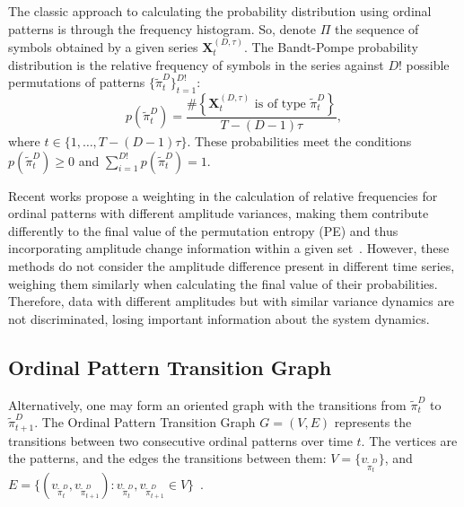 \documentclass[journal]{IEEEtran}
\begin{document}
	The classic approach to calculating the probability distribution using ordinal patterns is through the frequency histogram.
	So, denote $\Pi$ the sequence of symbols obtained by a given series $\mathbf{X}_t^{(D,\tau)}$.
	The Bandt-Pompe probability distribution is the relative frequency of symbols in the series against $D!$ possible permutations of patterns $\{\widetilde\pi_t^D \}_{t = 1}^{D!}$:
	\begin{equation}
		p(\widetilde\pi_t^D) = \frac{\#\left \{\mathbf{X}_t^{(D,\tau)} \text{ is of type } \widetilde\pi_t^D\right \}}{T- (D-1)\tau},  
	\end{equation}
	where  $t\in \{1, \dots, T-(D-1)\tau\}$.
	These probabilities meet the conditions $p(\widetilde\pi_t^D) \ge 0$ and  $\sum_{i=1}^{D!} p(\widetilde\pi_t^D) = 1$.
	
	Recent works propose a weighting in the calculation of relative frequencies for ordinal patterns with different amplitude variances, making them contribute differently to the final value of the permutation entropy (PE) and thus incorporating amplitude change information within a given set~\cite{Fadlallah2013Weightedpermutation}.
	However, these methods do not consider the amplitude difference present in different time series, weighing them similarly when calculating the final value of their probabilities.
	Therefore, data with different amplitudes but with similar variance dynamics are not discriminated, losing important information about the system dynamics.
	
	\subsection{Ordinal Pattern Transition Graph}\label{OPTG}
	
	Alternatively, one may form an oriented graph with the transitions from $\widetilde\pi_t^D$ to $\widetilde\pi_{t+1}^D$. 
	The Ordinal Pattern Transition Graph ${G} = ({V}, {E})$ 
	represents the transitions between two consecutive ordinal patterns over time $t$.
	The vertices are the patterns, and the edges the transitions between them:
	$V = \{v_{\widetilde\pi_t^D}\}$, and 
	$E = \{(v_{\widetilde\pi_t^D}, v_{\widetilde\pi_{t+1}^D}): v_{\widetilde\pi_t^D}, v_{\widetilde\pi_{t+1}^D} \in V \}$~\cite{LearningandDistinguishingTimeSeriesDynamicsViaOrdinalPatternsTransitionGraphs2019}.
	
\end{document}

